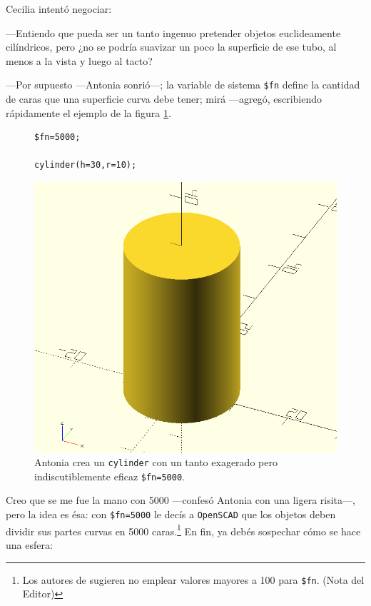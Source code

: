  Cecilia intentó negociar:

 ---Entiendo que pueda ser un tanto ingenuo pretender objetos
 euclideamente cilíndricos, pero ¿no se podría suavizar un poco la
 superficie de ese tubo, al menos a la vista y luego al tacto?

 ---Por supuesto ---Antonia sonrió---; la variable de sistema
 \lstinline!$fn! define la cantidad de caras que una superficie curva
 debe tener; mirá ---agregó, escribiendo rápidamente el ejemplo de la
 figura \ref{fig:cilindro-5000}. %

 
 \begin{figure}[ht]
  \begin{minipage}[]{.4\textwidth}
    \begin{lstlisting}
$fn=5000;

cylinder(h=30,r=10);
    \end{lstlisting}%
  \end{minipage}%
   \begin{minipage}[]{.6\textwidth}
     \centering
     \includegraphics[width=.9\textwidth]{imagenes/cilindro-5000}
   \end{minipage}
   \caption{Antonia crea un \lstinline!cylinder! con un tanto
     exagerado pero indiscutiblemente eficaz
     \lstinline!$fn=5000!.}%
  \label{fig:cilindro-5000}
\end{figure}

 
\guillemotright Creo que se me fue la mano con 5000 ---confesó Antonia
con una ligera risita---, pero la idea es ésa: con
\lstinline!$fn=5000! le decís a \texttt{OpenSCAD} que los objetos
deben dividir sus partes curvas en 5000 caras.\footnote{Los autores de
  \openscad{} sugieren no emplear valores mayores a 100 para
  \texttt{\$fn}. (Nota del Editor)} En fin, ya debés sospechar cómo se
hace una esfera: %


